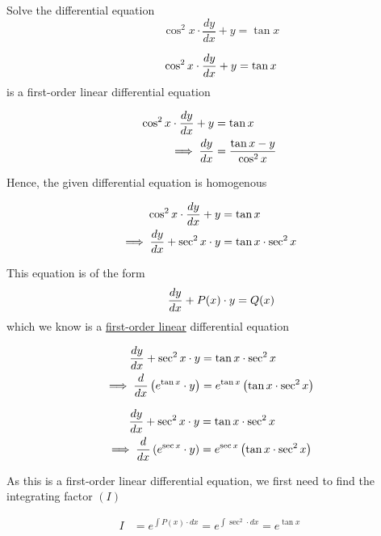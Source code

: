 \documentclass[14pt,fleqn]{extarticle}
\newcommand\intgf{e^{\tan x}}
\newcommand\expa{\tan x\cdot\sec^2 x}
\begin{document}
\begin{question}
\statement
	
Solve the differential equation 
\[ \qquad \cos^2 x\cdot \frac{dy}{dx} + y = \tan x \]
%

\begin{step}
  \begin{options} 
     \correct 
     \[ \qquad \cos^2 x\cdot \frac{dy}{dx} + y = \tan  x\]
     is a first-order linear differential equation        
     \incorrect
        
        \begin{align}
	\cos^2 x\cdot\frac{dy}{dx} + y &= \tan x \\ 
	\implies \frac{dy}{dx} &= \dfrac{\tan x - y}{\cos^2 x} 
\end{align}

Hence, the given differential equation is homogenous
    \end{options} 
     \reason 
     
     \begin{align}
	\cos^2 x\cdot\dydx + y &= \tan x \\
	\implies \dydx + \sec^2 x\cdot y &= \expa 
\end{align}  

This equation is of the form 
\[ \qquad \frac{dy}{dx} + P(x)\cdot y = Q(x) \]
which we know is a \underline{first-order linear} differential equation
\end{step}


\begin{step}
  \begin{options} 
     \correct 
       \begin{align}
	\dydx + \sec^2x\cdot y &= \tan x\cdot\sec^2 x \\
	\implies \ddx \left(\intgf\cdot y \right) &= \intgf \left(\expa \right)
\end{align}
     \incorrect
        
        \begin{align}
	\dydx + \sec^2x\cdot y &= \tan x\cdot\sec^2 x \\
	\implies \ddx \left(e^{\sec x}\cdot y \right) &= e^{\sec x} \left(\expa \right)
\end{align}
    \end{options} 
     \reason 
     
     As this is a first-order linear differential equation, we first need to find the integrating factor $(I)$\newline 
     
     \begin{align}
     I &= e^{\int P(x)\cdot dx} = e^{\int \sec^2\cdot dx} = \intgf 
\end{align}


\end{step}
\end{question}
\end{document}

